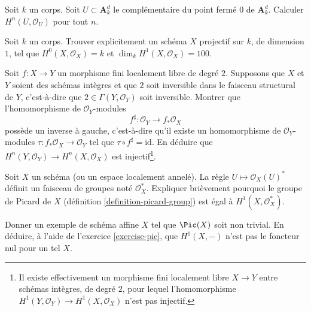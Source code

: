 \begin{exercise}
\label{exercise-compute-cohomology-affine-space-punctured}
Soit $k$ un corps. Soit $U \subset \mathbf{A}^d_k$ le
complémentaire du point fermé $0$ de $\mathbf{A}^d_k$.
Calculer $H^n(U, \mathcal{O}_U)$ pour tout $n$.
\end{exercise}

\begin{exercise}
\label{exercise-find-curve-genus-one-hundred}
Soit $k$ un corps. Trouver explicitement un schéma $X$ projectif sur $k$,
de dimension $1$, tel que $H^0(X, \mathcal{O}_X) = k$ et
$\dim_k H^1(X, \mathcal{O}_X) = 100$.
\end{exercise}

\begin{exercise}
\label{exercise-degree-2-cover}
Soit $f : X \to Y$ un morphisme fini localement libre de degré $2$.
Supposons que $X$ et $Y$ soient des schémas intègres et que $2$ soit inversible
dans le faisceau structural de $Y$, c'est-à-dire que $2 \in \Gamma(Y, \mathcal{O}_Y)$
soit inversible. Montrer que l'homomorphisme de $\mathcal{O}_Y$-modules
$$
f^\sharp : \mathcal{O}_Y \longrightarrow f_*\mathcal{O}_X
$$
possède un inverse à gauche, c'est-à-dire qu'il existe un homomorphisme de $\mathcal{O}_Y$-modules
$\tau : f_*\mathcal{O}_X \to \mathcal{O}_Y$
tel que $\tau \circ f^\sharp = \text{id}$.
En déduire que $H^n(Y, \mathcal{O}_Y) \to H^n(X, \mathcal{O}_X)$
est injectif\footnote{Il existe effectivement un morphisme fini localement libre
$X \to Y$ entre schémas intègres, de degré $2$, pour lequel l'homomorphisme
$H^1(Y, \mathcal{O}_Y) \to H^1(X, \mathcal{O}_X)$ n'est pas injectif.}.
\end{exercise}

\begin{exercise}
\label{exercise-pic}
Soit $X$ un schéma (ou un espace localement annelé). La règle
$U \mapsto \mathcal{O}_X(U)^*$ définit un faisceau de groupes
noté $\mathcal{O}_X^*$.
Expliquer brièvement pourquoi le groupe de Picard de $X$
(définition \ref{definition-picard-group}) est
égal à $H^1(X, \mathcal{O}_X^*)$.
\end{exercise}

\begin{exercise}
\label{exercise-pic-nontrivial}
Donner un exemple de schéma affine $X$ tel que $\Pic(X)$ soit non trivial.
En déduire, à l'aide de l'exercice \ref{exercise-pic}, que $H^1(X, -)$ n'est pas le
foncteur nul pour un tel $X$.
\end{exercise}

